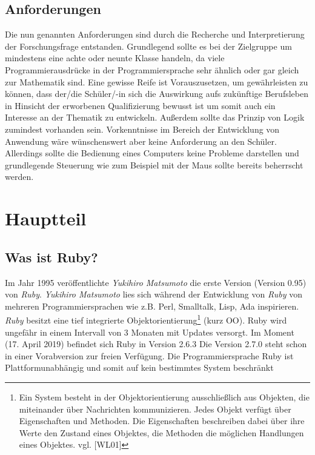 \documentclass[12pt,DIV=14, version=first, BCOR=10mm,a4paper,twoside,parskip=half-,headsepline,headinclude]{scrartcl}
\begin{document}
\subsection{Anforderungen}
\begin{flushleft}
Die nun genannten Anforderungen sind durch die Recherche und Interpretierung  der Forschungsfrage entstanden. Grundlegend sollte es bei der Zielgruppe um mindestens eine achte oder neunte Klasse handeln, da viele Programmierausdrücke in der Programmiersprache sehr ähnlich oder gar gleich zur Mathematik sind. Eine gewisse Reife ist Vorauszusetzen, um gewährleisten zu können, dass der/die Schüler/-in sich die Auswirkung aufs zukünftige Berufsleben in Hinsicht der erworbenen Qualifizierung bewusst ist um somit auch ein Interesse an der Thematik zu entwickeln. Außerdem sollte das Prinzip von Logik zumindest vorhanden sein. Vorkenntnisse im Bereich der Entwicklung von Anwendung wäre wünschenswert aber keine Anforderung an den Schüler. Allerdings sollte die Bedienung eines Computers keine Probleme darstellen und grundlegende Steuerung wie zum Beispiel mit der Maus sollte bereits beherrscht werden.
\end{flushleft}

\section{Hauptteil}

\subsection{Was ist Ruby?} \label{Was ist Ruby?}
\begin{flushleft}
Im Jahr 1995 veröffentlichte \textit{Yukihiro Matsumoto} die erste Version (Version 0.95) von \textit{\glqq Ruby\grqq}. \textit{Yukihiro Matsumoto} lies sich während der Entwicklung von \textit{\glqq Ruby\grqq} von mehreren Programmiersprachen wie z.B. Perl, Smalltalk, Lisp, Ada inspirieren. \textit{Ruby} besitzt eine tief integrierte
Objektorientierung\footnote{\label{foot:1} Ein System besteht in der Objektorientierung ausschließlich aus Objekten, die miteinander über Nachrichten kommunizieren. Jedes Objekt verfügt über Eigenschaften und Methoden. Die Eigenschaften beschreiben dabei über ihre Werte den Zustand eines Objektes, die Methoden die möglichen Handlungen eines Objektes. vgl. [WL01]} (kurz OO). Ruby wird ungefähr in einem Intervall von 3 Monaten mit Updates versorgt. Im Moment (17. April 2019) befindet sich Ruby in Version 2.6.3 Die Version 2.7.0 steht schon in einer Vorabversion zur freien Verfügung. Die Programmiersprache Ruby ist Plattformunabhängig und somit auf kein bestimmtes System beschränkt
\end{flushleft}
\end{document}
